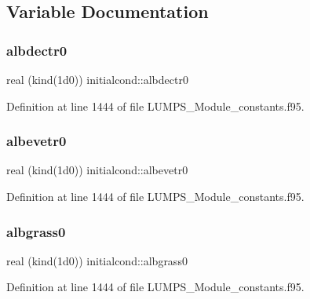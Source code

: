\subsection{Variable Documentation}
\mbox{\label{namespaceinitialcond_a4adfa02ebcb41c5e25a3afaa2fbc79bd}} 
\subsubsection{\texorpdfstring{albdectr0}{albdectr0}}
{\footnotesize\ttfamily real (kind(1d0)) initialcond\+::albdectr0}



Definition at line 1444 of file L\+U\+M\+P\+S\+\_\+\+Module\+\_\+constants.\+f95.

\mbox{\label{namespaceinitialcond_ad69d04d9c931b44b5494a8ca83f02a17}} 
\subsubsection{\texorpdfstring{albevetr0}{albevetr0}}
{\footnotesize\ttfamily real (kind(1d0)) initialcond\+::albevetr0}



Definition at line 1444 of file L\+U\+M\+P\+S\+\_\+\+Module\+\_\+constants.\+f95.

\mbox{\label{namespaceinitialcond_a1690b92f7ee51436213bdce6c0d70dc2}} 
\subsubsection{\texorpdfstring{albgrass0}{albgrass0}}
{\footnotesize\ttfamily real (kind(1d0)) initialcond\+::albgrass0}



Definition at line 1444 of file L\+U\+M\+P\+S\+\_\+\+Module\+\_\+constants.\+f95.

\mbox{\label{namespaceinitialcond_a85ca43d1e5c8bfe458e5e9d0e806f672}} 
